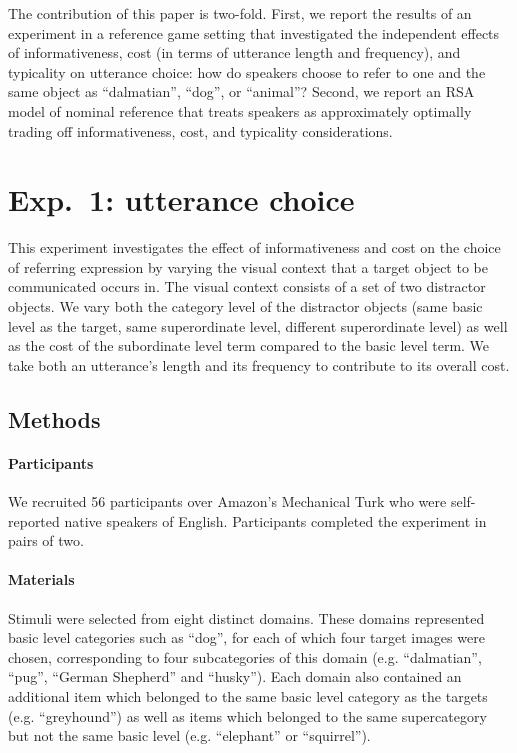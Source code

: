 \documentclass[10pt,letterpaper]{article}
\newcommand{\ndg}[1]{\textcolor{Green}{[ndg: #1]}}
\begin{document}
The contribution of this paper is two-fold. First, we report the results of an experiment in a reference game setting that investigated the independent effects of informativeness, cost (in terms of utterance length and frequency), and typicality on utterance choice: how do speakers choose to refer to one and the same object as ``dalmatian'', ``dog'', or ``animal''? Second, we report an RSA model of nominal reference that treats speakers as approximately optimally trading off informativeness, cost, and typicality considerations.

\section{Exp.~1: utterance choice}

This experiment investigates the effect of informativeness and cost on the choice of referring expression by varying the visual context that a target object to be communicated occurs in. The visual context consists of a set of two distractor objects. We vary both the category level of the distractor objects (same basic level as the target, same superordinate level, different superordinate level) as well as the cost of the subordinate level term compared to the basic level term. We take both an utterance's  length and its frequency to contribute to its overall cost.


\subsection{\bf Methods}


\paragraph{\bf Participants}
We recruited 56 participants over Amazon's Mechanical Turk who were self-reported native speakers of English. Participants completed the experiment in pairs of two.

\paragraph{\bf Materials}
Stimuli were selected from eight distinct domains. These domains represented basic level categories such as ``dog'', for each of which four target images were chosen, corresponding to four subcategories of this domain (e.g. ``dalmatian'', ``pug'', ``German Shepherd'' and ``husky''). Each domain also contained an additional item which belonged to the same basic level category as the targets (e.g. ``greyhound'') as well as items which belonged to the same supercategory but not the same basic level (e.g. ``elephant'' or ``squirrel''). 
\end{document}
